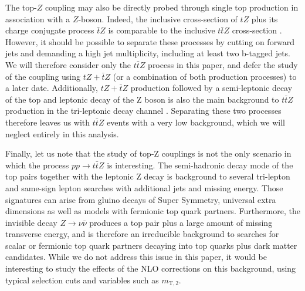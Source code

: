 \documentclass[preprint]{JHEP3} %
\def\ttbZ{t\bar{t}Z}
\begin{document}


The top-$Z$ coupling may also be directly probed through single top production in association with a $Z$-boson. 
Indeed, the inclusive cross-section of $tZ$ plus its charge conjugate process $\bar{t}Z$ is comparable to the inclusive $\ttbZ$ cross-section \cite{Campbell:2013yla}. 
However, it should be possible to separate these processes by cutting on forward jets and demanding a high jet multiplicity, including at least two b-tagged jets. 
We will therefore consider only the $\ttbZ$ process in this paper, and defer the study of the coupling using $tZ+\bar{t}Z$ (or a combination of both production processes) to a later date. 
Additionally, $tZ+\bar{t}Z$ production followed by a semi-leptonic decay of the top and leptonic decay of the Z boson is also the main background to $\ttbZ$ production in the tri-leptonic decay channel \cite{Baur:2004uw}. Separating these two processes therefore leaves us with $\ttbZ$ events with a very low background, which we will neglect entirely in this analysis.


Finally, let us note that the study of top-Z couplings is not the only scenario in which the process $pp\to\ttbZ$ is interesting. 
The semi-hadronic decay mode of the top pairs together with the leptonic Z decay is background to several tri-lepton and same-sign lepton searches with additional jets and missing energy.
Those signatures can arise from gluino decays of Super Symmetry, universal extra dimensions as well as models with fermionic top quark partners. 
Furthermore, the invisible decay $Z \to \nu \bar{\nu}$ produces a top pair plus a large amount of missing transverse energy, and is therefore an irreducible background to searches for 
scalar or fermionic top quark partners decaying into top quarks plus dark matter candidates.
While we do not address this issue in this paper, it would be interesting to study the effects of the NLO corrections on this background, using typical selection cuts 
and variables such as $m_{\mathrm{T},2}$.
\end{document}
